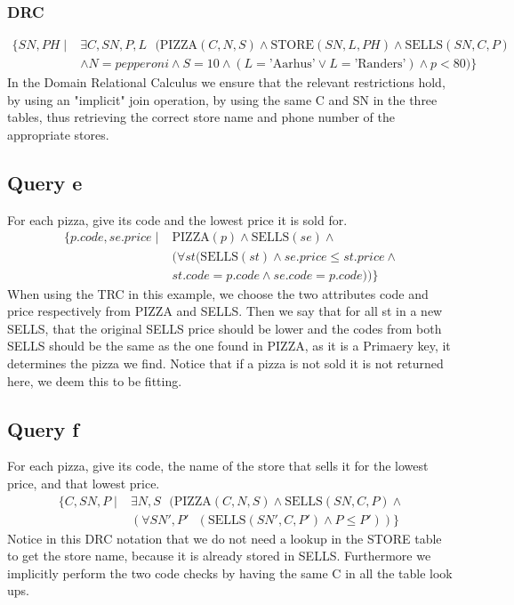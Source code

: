 \documentclass{article}
\theoremstyle{remark}
\numberwithin{equation}{section}
\begin{document}
\subsubsection{DRC}
\begin{align*}
    \{SN,PH\mid &\exists C,SN,P,L\text{ }( \text{PIZZA}(C,N,S)\wedge \text{STORE}(SN,L,PH) \wedge \text{SELLS}(SN,C,P)\\
    &\wedge N = pepperoni \wedge S = 10
 \wedge (L=\text{'Aarhus'} \vee L = \text{'Randers'})\wedge p < 80) \}
\end{align*}
In the Domain Relational Calculus we ensure that the relevant restrictions hold, by using an "implicit" join operation, by using the same C and SN in the three tables, thus retrieving the correct store name and phone number of the appropriate stores.   
\subsection{Query e}
For each pizza, give its code and the lowest price it is sold for.\\
\begin{align*}
    \{p.code,se.price \mid &\text{PIZZA}(p) \wedge \text{SELLS}(se) \wedge
    \\&(\forall st (\text{SELLS}(st)\wedge se.price\leq st.price \wedge
    \\&st.code=p.code \wedge se.code=p.code)) \}
\end{align*}
When using the TRC in this example, we choose the two attributes code and price respectively from PIZZA and SELLS. Then we say that for all st in a new SELLS, that the original SELLS price should be lower and the codes from both SELLS should be the same as the one found in PIZZA, as it is a Primaery key, it determines the pizza we find.
Notice that if a pizza is not sold it is not returned here, we deem this to be fitting.

\subsection{Query f}
For each pizza, give its code, the name of the store that sells it for the lowest price, and that lowest price.
\begin{align*}
    \{C,SN,P \mid &\exists  N,S \text{ }( \text{PIZZA}(C,N,S) \wedge \text{SELLS}(SN,C,P)\wedge\\
    &(\forall SN',P' \text{ }( \text{SELLS}(SN',C,P') \wedge P \leq P' )
    )\}
\end{align*}
Notice in this DRC notation that we do not need a lookup in the STORE table to get the store name, because it is already stored in SELLS. Furthermore we implicitly perform the two code checks by having the same C in all the table look ups.
\end{document}
